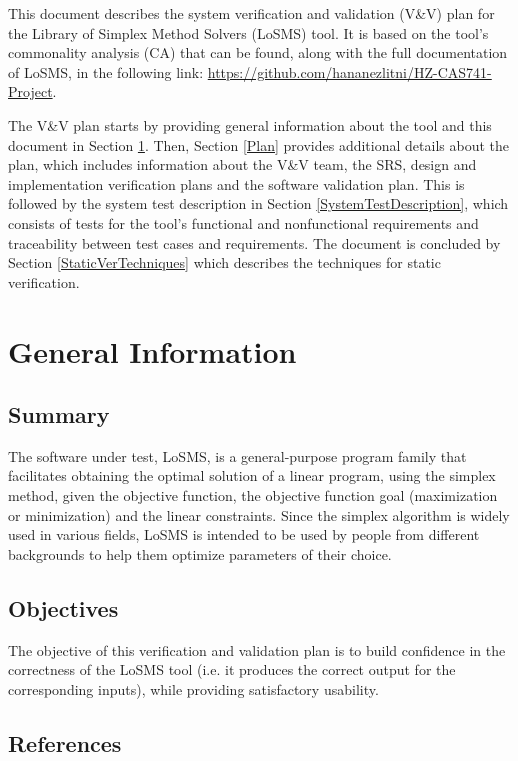 \documentclass[12pt, titlepage]{article}
\newcommand{\famname}{LoSMS} %
\begin{document}
This document describes the system verification and validation (V\&V) plan for 
the Library of Simplex Method Solvers (\famname{}) tool. It is based on the 
tool's commonality analysis (CA) that can be found, along with the full 
documentation of \famname{}, in the following link:  
\url{https://github.com/hananezlitni/HZ-CAS741-Project}.

The V\&V plan starts by providing general information about the tool and this 
document in Section \ref{GeneralInfo}. Then, Section \ref{Plan} provides 
additional details about the plan, which includes information about the V\&V 
team, the SRS, design and implementation verification plans and the software 
validation plan. This is followed by the system test description in Section 
\ref{SystemTestDescription}, which consists of tests for the tool's functional 
and nonfunctional requirements and traceability between test cases and 
requirements. The document is concluded by Section \ref{StaticVerTechniques} 
which describes the techniques for static verification.

\section{General Information} \label{GeneralInfo}

\subsection{Summary}

The software under test, \famname{}, is a general-purpose program family that 
facilitates obtaining the optimal solution of a linear program, using the 
simplex method, given the objective function, the objective function goal 
(maximization or minimization) and the linear constraints. Since the simplex 
algorithm is widely used in various fields, \famname{} is intended to be used 
by people from different backgrounds to help them optimize parameters of their 
choice.

\subsection{Objectives}

The objective of this verification and validation plan is to build confidence 
in the correctness of the \famname{} tool (i.e. it produces the correct output 
for the corresponding inputs), while providing satisfactory usability.

\subsection{References}
\end{document}
